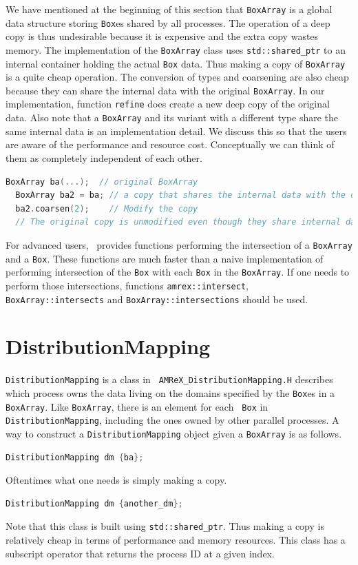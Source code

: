 {We have mentioned at the beginning of this section that {\tt BoxArray}
is a global data structure storing {\tt Box}es shared by all processes.
The operation of a deep copy is thus undesirable because it
is expensive and the extra copy wastes memory.  The
implementation of the {\tt BoxArray} class uses {\tt std::shared\_ptr}
to an internal container holding the actual {\tt Box} data.  Thus
making a copy of {\tt BoxArray} is a quite cheap operation.  The
conversion of types and coarsening are also cheap because they can
share the internal data with the original {\tt BoxArray}.  In our
implementation, function
{\tt refine} does create a new deep copy of the original data.  Also
note that a {\tt BoxArray} and its variant with a different type share
the same internal data is an implementation detail.  We discuss this
so that the users are aware of the performance and resource cost.
Conceptually we can think of them as completely independent of each
other.
\begin{lstlisting}[language=cpp]
  BoxArray ba(...);  // original BoxArray
  BoxArray ba2 = ba; // a copy that shares the internal data with the original
  ba2.coarsen(2);    // Modify the copy
  // The original copy is unmodified even though they share internal data.
\end{lstlisting}

For advanced users, \amrex\ provides functions performing the
intersection of a {\tt BoxArray} and a {\tt Box}.  These functions are
much faster than a naive implementation of performing intersection of
the {\tt Box} with each {\tt Box} in the {\tt BoxArray}.  If one needs
to perform those intersections, functions {\tt amrex::intersect}, {\tt
  BoxArray::intersects} and {\tt BoxArray::intersections} should be
used.

\section{DistributionMapping}
\label{sec:basics:dm}

{\tt DistributionMapping} is a class in {\tt
  AMReX\_DistributionMapping.H} describes which process owns the data
living on the domains specified by the {\tt Box}es in a {\tt
  BoxArray}.  Like {\tt BoxArray}, there is an element for each {\tt
  Box} in {\tt DistributionMapping}, including the ones owned by other
parallel processes.  A way to construct a {\tt DistributionMapping}
object given a {\tt BoxArray} is as follows.
\begin{lstlisting}[language=cpp]
  DistributionMapping dm {ba};
\end{lstlisting}
Oftentimes what one needs is simply making a copy. 
\begin{lstlisting}[language=cpp]
  DistributionMapping dm {another_dm};
\end{lstlisting}
Note that this class is built using {\tt std::shared\_ptr}.  Thus
making a copy is relatively cheap in terms of performance and memory
resources.  This class has a subscript operator that returns the
process ID at a given index.

}
